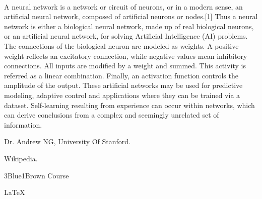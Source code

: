 \documentclass[12pt , a4paper]{article}
\begin{document}
\paragraph{} A neural network is a network or circuit of neurons, or in a modern sense, an artificial neural network, composed of artificial neurons or nodes.[1] Thus a neural network is either a biological neural network, made up of real biological neurons, or an artificial neural network, for solving Artificial Intelligence (AI) problems. The connections of the biological neuron are modeled as weights. A positive weight reflects an excitatory connection, while negative values mean inhibitory connections. All inputs are modified by a weight and summed. This activity is referred as a linear combination. Finally, an activation function controls the amplitude of the output. These artificial networks may be used for predictive modeling, adaptive control and applications where they can be trained via a dataset. Self-learning resulting from experience can occur within networks, which can derive conclusions from a complex and seemingly unrelated set of information.
\newpage

\begin{thebibliography}{9}
Dr. Andrew NG, University Of Stanford. 

 
Wikipedia.

 
3Blue1Brown Course 

\end{thebibliography}











\LaTeX
\end{document}
